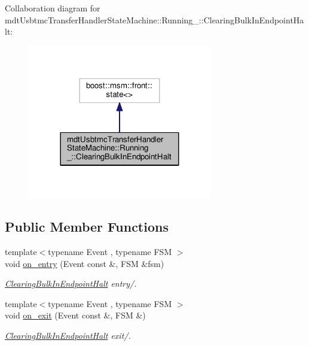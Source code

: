 Collaboration diagram for mdt\-Usbtmc\-Transfer\-Handler\-State\-Machine\-:\-:Running\-\_\-\-:\-:Clearing\-Bulk\-In\-Endpoint\-Halt\-:
\nopagebreak
\begin{figure}[H]
\begin{center}
\leavevmode
\includegraphics[width=228pt]{structmdt_usbtmc_transfer_handler_state_machine_1_1_running___1_1_clearing_bulk_in_endpoint_halt__coll__graph}
\end{center}
\end{figure}
\subsection*{Public Member Functions}
\begin{DoxyCompactItemize}
\item 
{\footnotesize template$<$typename Event , typename F\-S\-M $>$ }\\void \hyperlink{structmdt_usbtmc_transfer_handler_state_machine_1_1_running___1_1_clearing_bulk_in_endpoint_halt_a006205ba96d070b544d6b7d26ceb0f04}{on\-\_\-entry} (Event const \&, F\-S\-M \&fsm)
\begin{DoxyCompactList}\small\item\em \hyperlink{structmdt_usbtmc_transfer_handler_state_machine_1_1_running___1_1_clearing_bulk_in_endpoint_halt}{Clearing\-Bulk\-In\-Endpoint\-Halt} entry/. \end{DoxyCompactList}\item 
{\footnotesize template$<$typename Event , typename F\-S\-M $>$ }\\void \hyperlink{structmdt_usbtmc_transfer_handler_state_machine_1_1_running___1_1_clearing_bulk_in_endpoint_halt_af895c46601de5cef0be5cade2c97f3ed}{on\-\_\-exit} (Event const \&, F\-S\-M \&)
\begin{DoxyCompactList}\small\item\em \hyperlink{structmdt_usbtmc_transfer_handler_state_machine_1_1_running___1_1_clearing_bulk_in_endpoint_halt}{Clearing\-Bulk\-In\-Endpoint\-Halt} exit/. \end{DoxyCompactList}\end{DoxyCompactItemize}


